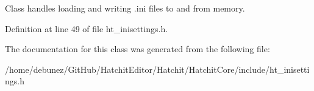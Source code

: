 Class handles loading and writing .ini files to and from memory. 

Definition at line 49 of file ht\+\_\+inisettings.\+h.



The documentation for this class was generated from the following file\+:\begin{DoxyCompactItemize}
\item 
/home/debunez/\+Git\+Hub/\+Hatchit\+Editor/\+Hatchit/\+Hatchit\+Core/include/ht\+\_\+inisettings.\+h\end{DoxyCompactItemize}
